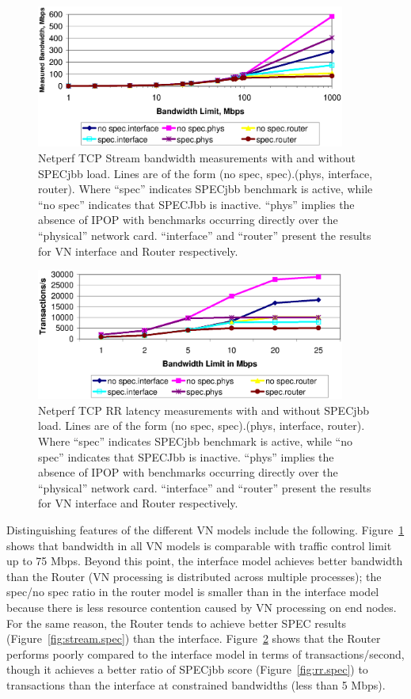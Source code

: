 \begin{figure}
\centering
\includegraphics[width=4in]{figs/stream.netperf.jpg.eps}
\caption[Grid Netperf bandwidth evaluation]{Netperf TCP Stream bandwidth
measurements with and without SPECjbb load.  Lines are of the form (no spec,
spec).(phys, interface, router).  Where ``spec'' indicates SPECjbb benchmark is
active, while ``no spec'' indicates that SPECJbb is inactive. ``phys'' implies
the absence of IPOP with benchmarks occurring directly over the ``physical''
network card.  ``interface'' and ``router'' present the results for VN
interface and Router respectively.}
\label{fig:stream.netperf}
\end{figure}

\begin{figure}
\centering
\includegraphics[width=4in]{figs/rr.netperf.jpg.eps}
\caption[Grid Netperf latency evaluation]{Netperf TCP RR latency measurements
with and without SPECjbb load.  Lines are of the form (no spec, spec).(phys,
interface, router).  Where ``spec'' indicates SPECjbb benchmark is active,
while ``no spec'' indicates that SPECJbb is inactive. ``phys'' implies the
absence of IPOP with benchmarks occurring directly over the ``physical''
network card.  ``interface'' and ``router'' present the results for VN
interface and Router respectively.}
\label{fig:rr.netperf}
\end{figure}


Distinguishing features of the different VN models include the following.
Figure~\ref{fig:stream.netperf} shows that bandwidth in all VN models is
comparable with traffic control limit up to 75 Mbps. Beyond this point, the
interface model achieves better bandwidth than the Router (VN processing
is distributed across multiple processes); the spec/no spec ratio in the router
model is smaller than in the interface model because there is less resource
contention caused by VN processing on end nodes. For the same reason, the
Router tends to achieve better SPEC results (Figure~\ref{fig:stream.spec}) than
the interface.  Figure~\ref{fig:rr.netperf} shows that the Router performs
poorly compared to the interface model in terms of transactions/second, though
it achieves a better ratio of SPECjbb score (Figure~\ref{fig:rr.spec}) to
transactions than the interface at constrained bandwidths (less than 5 Mbps).

